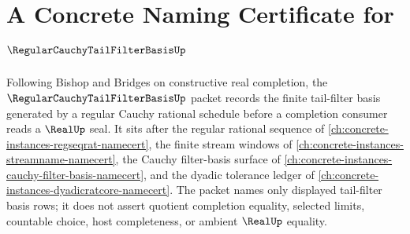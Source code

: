 \chapter{A Concrete Naming Certificate for $\RegularCauchyTailFilterBasisUp$}
\label{ch:concrete-instances-regular-cauchy-tail-filter-basis-namecert}

Following Bishop and Bridges on constructive real completion, the $\RegularCauchyTailFilterBasisUp$ packet records the finite tail-filter basis generated by a regular Cauchy rational schedule before a completion consumer reads a $\RealUp$ seal. It sits after the regular rational sequence of \autoref{ch:concrete-instances-regseqrat-namecert}, the finite stream windows of \autoref{ch:concrete-instances-streamname-namecert}, the Cauchy filter-basis surface of \autoref{ch:concrete-instances-cauchy-filter-basis-namecert}, and the dyadic tolerance ledger of \autoref{ch:concrete-instances-dyadicratcore-namecert}. The packet names only displayed tail-filter basis rows; it does not assert quotient completion equality, selected limits, countable choice, host completeness, or ambient $\RealUp$ equality.

